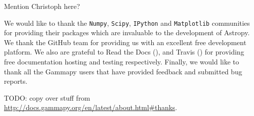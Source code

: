 \begin{acknowledgements}

Mention Christoph here?

We would like to thank the \texttt{Numpy}, \texttt{Scipy}, \texttt{IPython} and
\texttt{Matplotlib} communities for providing their packages which are invaluable
to the development of Astropy. We thank the GitHub team for providing us with
an excellent free development platform. We also are grateful to Read the Docs
(\ReadthedocsUrl), and Travis
(\TravisUrl) for providing free documentation
hosting and testing respectively. Finally, we would like to thank all the
Gammapy users that have provided feedback and submitted bug reports.    
    
TODO: copy over stuff from \url{http://docs.gammapy.org/en/latest/about.html#thanks}.

\end{acknowledgements}
